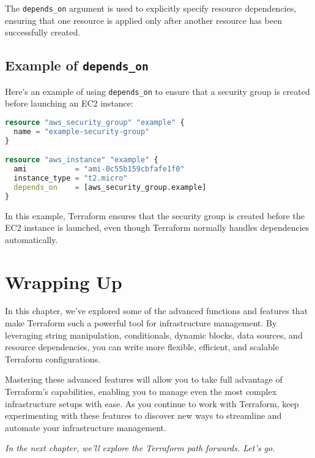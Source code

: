 The \texttt{depends\_on} argument is used to explicitly specify resource dependencies, ensuring that one resource is applied only after another resource has been successfully created.

\subsection{Example of \texttt{depends\_on}}

Here's an example of using \texttt{depends\_on} to ensure that a security group is created before launching an EC2 instance:

\begin{lstlisting}[language=terraform]
resource "aws_security_group" "example" {
  name = "example-security-group"
}

resource "aws_instance" "example" {
  ami           = "ami-0c55b159cbfafe1f0"
  instance_type = "t2.micro"
  depends_on    = [aws_security_group.example]
}
\end{lstlisting}

In this example, Terraform ensures that the security group is created before the EC2 instance is launched, even though Terraform normally handles dependencies automatically.

\section{Wrapping Up}

In this chapter, we've explored some of the advanced functions and features that make Terraform such a powerful tool for infrastructure management. By leveraging string manipulation, conditionals, dynamic blocks, data sources, and resource dependencies, you can write more flexible, efficient, and scalable Terraform configurations.

Mastering these advanced features will allow you to take full advantage of Terraform's capabilities, enabling you to manage even the most complex infrastructure setups with ease. As you continue to work with Terraform, keep experimenting with these features to discover new ways to streamline and automate your infrastructure management.

\vspace{1em}

\textit{In the next chapter, we'll explore the Terraform path forwards. Let's go.}

